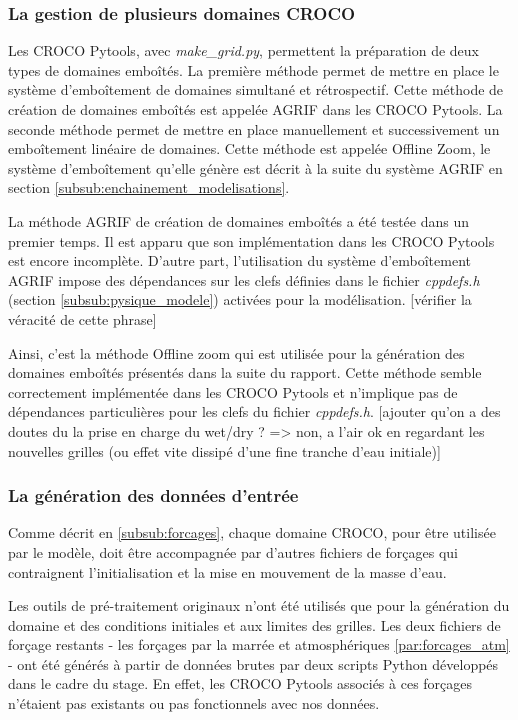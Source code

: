 \documentclass[10pt,a4paper,titlepage]{article}
\begin{document}
\subsubsection{La gestion de plusieurs domaines CROCO}
\label{subsub:gestion_multi_domaines}
Les CROCO Pytools, avec \textit{make\_grid.py}, permettent la préparation de deux types de domaines emboîtés.
La première méthode permet de mettre en place le système d'emboîtement de domaines simultané et rétrospectif.
Cette méthode de création de domaines emboîtés est appelée AGRIF dans les CROCO Pytools.
La seconde méthode permet de mettre en place manuellement et successivement un emboîtement linéaire de domaines.
Cette méthode est appelée Offline Zoom, le système d'emboîtement qu'elle génère est décrit à la suite du système AGRIF en section \ref{subsub:enchainement_modelisations}.

La méthode AGRIF de création de domaines emboîtés a été testée dans un premier temps.
Il est apparu que son implémentation dans les CROCO Pytools est encore incomplète.
D'autre part, l'utilisation du système d'emboîtement AGRIF impose des dépendances sur les clefs définies dans le fichier \textit{cppdefs.h} (section \ref{subsub:pysique_modele}) activées pour la modélisation.
[vérifier la véracité de cette phrase]

Ainsi, c'est la méthode Offline zoom qui est utilisée pour la génération des domaines emboîtés présentés dans la suite du rapport.
Cette méthode semble correctement implémentée dans les CROCO Pytools et n'implique pas de dépendances particulières pour les clefs du fichier \textit{cppdefs.h}.
[ajouter qu'on a des doutes du la prise en charge du wet/dry ? => non, a l'air ok en regardant les nouvelles grilles (ou effet vite dissipé d'une fine tranche d'eau initiale)]

\subsubsection{La génération des données d'entrée}
\label{generation_donnees_entrée}
Comme décrit en \ref{subsub:forcages}, chaque domaine CROCO, pour être utilisée par le modèle, doit être accompagnée par d'autres fichiers de forçages qui contraignent l'initialisation et la mise en mouvement de la masse d'eau.

Les outils de pré-traitement originaux n'ont été utilisés que pour la génération du domaine et des conditions initiales et aux limites des grilles.
Les deux fichiers de forçage restants - les forçages par la marrée et atmosphériques \ref{par:forcages_atm} - ont été générés à partir de données brutes par deux scripts Python développés dans le cadre du stage.
En effet, les CROCO Pytools associés à ces forçages n'étaient pas existants ou pas fonctionnels avec nos données.
\end{document}
